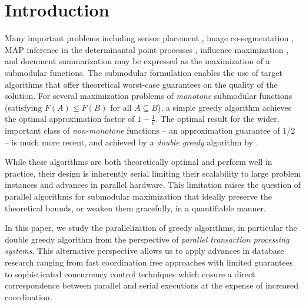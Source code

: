 \documentclass{article} %
\begin{document}
\begin{abstract}

\end{abstract}

\section{Introduction}



Many important problems including sensor placement \cite{krauseGuestrin11}, image co-segmentation \cite{kim11}, MAP inference in the determinantal point processes \cite{gillenwater12}, influence maximization \cite{kkt03}, and document summarization \cite{lin11} may be expressed as the maximization of a submodular functions.
The submodular formulation enables the use of target algorithms \cite{buchbinder2012,nemhauser1978} that offer theoretical worst-case guarantees on the quality of the solution. 
For several maximization problems of \emph{monotone} submodular functions (satisfying $F(A) \leq F(B)$ for all $A \subseteq B$), a simple greedy algorithm \cite{nemhauser1978} achieves the optimal approximation factor of $1-\frac{1}{e}$. 
The optimal result for the wider, important class of \emph{non-monotone} functions  -- an approximation guarantee of $1/2$ --  is much more recent, and achieved by a \emph{double greedy} algorithm by \citet{buchbinder2012}.


While these algorithms are both theoretically optimal and perform well in practice, their design is inherently serial limiting their scalability to large problem instances and advances in parallel hardware.
This limitation raises the question of parallel algorithms for submodular maximization that ideally preserve the theoretical bounds, or weaken them gracefully, in a quantifiable manner. 


In this paper, we study the parallelization of greedy algorithms, in particular the double greedy algorithm from the perspective of \emph{parallel transaction processing systems}. 
This alternative perspective allows us to apply advances in database research ranging from fast coordination free approaches with limited guarantees to sophisticated concurrency control techniques which ensure a direct correspondence between parallel and serial executions at the expense of increased coordination. %
\end{document}
